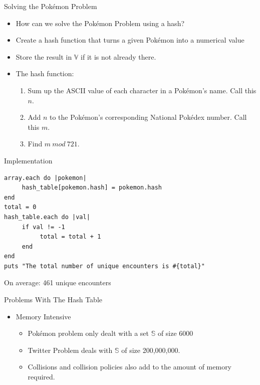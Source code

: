 \documentclass{beamer}
\begin{document}
\begin{frame}{Solving the Pok\'emon Problem}
\begin{itemize}
\item How can we solve the Pok\'emon Problem using a hash?
\pause
\item Create a hash function that turns a given Pok\'emon into a numerical value
\pause
\item Store the result in $\mathbb{V}$ if it is not already there.
\pause
\item The hash function:
\begin{enumerate}
\item Sum up the ASCII value of each character in a Pok\'emon's name. Call this $n$.
\pause
\item Add $n$ to the Pok\'emon's corresponding National Pok\'edex number. Call this $m$.
\pause
\item Find $m\ mod\ 721$.
\end{enumerate}
\end{itemize}
\end{frame}

\begin{frame}[fragile]{Implementation}
\begin{lstlisting}[basicstyle=\small]
array.each do |pokemon|
     hash_table[pokemon.hash] = pokemon.hash
end
total = 0
hash_table.each do |val|
     if val != -1
          total = total + 1
     end
end
puts "The total number of unique encounters is #{total}"
\end{lstlisting}
\pause
On average: 461 unique encounters
\end{frame}

\begin{frame}{Problems With The Hash Table}
\begin{itemize}
\item Memory Intensive
\begin{itemize}
\item Pok\'emon problem only dealt with a set $\mathbb{S}$ of size 6000
\pause
\item Twitter Problem deals with $\mathbb{S}$ of size 200,000,000.
\pause
\item Collisions and collision policies also add to the amount of memory required.
\end{itemize}
\end{itemize}
\end{frame}
\end{document}
